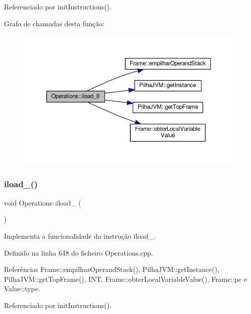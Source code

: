 Referenciado por init\+Instructions().

Grafo de chamadas desta função\+:
\nopagebreak
\begin{figure}[H]
\begin{center}
\leavevmode
\includegraphics[width=350pt]{classOperations_a3aba059cf78681767c141d27989fc2aa_cgraph}
\end{center}
\end{figure}
\mbox{\label{classOperations_a4b9d8ef21894c0db2203c06712e97765}} 
\subsubsection{\texorpdfstring{iload\+\_()}{iload\_1()}}
{\footnotesize\ttfamily void Operations\+::iload\+\_ (\begin{DoxyParamCaption}{ }\end{DoxyParamCaption})\hspace{0.3cm}{\ttfamily [private]}}



Implementa a funcionalidade da instrução iload\+\_. 



Definido na linha 648 do ficheiro Operations.\+cpp.



Referências Frame\+::empilhar\+Operand\+Stack(), Pilha\+J\+V\+M\+::get\+Instance(), Pilha\+J\+V\+M\+::get\+Top\+Frame(), I\+NT, Frame\+::obter\+Local\+Variable\+Value(), Frame\+::pc e Value\+::type.



Referenciado por init\+Instructions().

